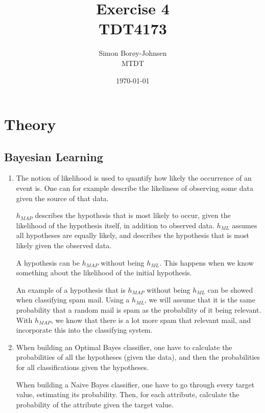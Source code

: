 \documentclass{article}
\begin{document}
\title{\textbf{Exercise 4} \\ TDT4173}
\author{Simon Borøy-Johnsen \\ MTDT}
\date{\today}
\maketitle


\section{Theory}
\subsection*{Bayesian Learning}
\begin{enumerate}
    \item
        The notion of likelihood is used to quantify how likely the occurrence of an event is. One can for example describe the likeliness of observing some data given the source of that data.
    
        $h_{MAP}$ describes the hypothesis that is most likely to occur, given the likelihood of the hypothesis itself, in addition to observed data. $h_{ML}$ assumes all hypotheses are equally likely, and describes the hypothesis that is most likely given the observed data.
    
        A hypothesis can be $h_{MAP}$ without being $h_{ML}$. This happens when we know something about the likelihood of the initial hypothesis.
    
        An example of a hypothesis that is $h_{MAP}$ without being $h_{ML}$ can be showed when classifying spam mail. Using a $h_{ML}$, we will assume that it is the same probability that a random mail is spam as the probability of it being relevant. With $h_{MAP}$, we know that there is a lot more spam that relevant mail, and incorporate this into the classifying system.
    
    \item
        When building an Optimal Bayes classifier, one have to calculate the probabilities of all the hypotheses (given the data), and then the probabilities for all classifications given the hypotheses.

        When building a Naive Bayes classifier, one have to go through every target value, estimating its probability. Then, for each attribute, calculate the probability of the attribute given the target value.
        

\end{enumerate}
\end{document}
